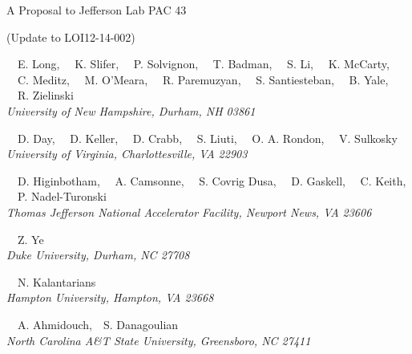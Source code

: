 \begin{center}
A Proposal to Jefferson Lab PAC 43

(Update to LOI12-14-002)

\vspace{15px}

\setcounter{footnote}{\SPOKES}
%
{~~E. Long,\setcounter{footnote}{\SPOKES}
\setcounter{footnote}{\SPOKES}\footnotemark {}
\setcounter{footnote}{\CONTACT}\footnotemark{}
~~K. Slifer,\setcounter{footnote}{\SPOKES}\footnotemark
~~P. Solvignon,\setcounter{footnote}{\SPOKES}\footnotemark
~~T. Badman,
~~S. Li,
~~K. McCarty,
~~C. Meditz,
~~M. O'Meara,
~~R. Paremuzyan,
~~S. Santiesteban,
~~B. Yale,
~~R. Zielinski
}\\
\ls
{\normalsize\it{University of New Hampshire, Durham, NH 03861}}

\vspace{10px}

{~~D. Day,\setcounter{footnote}{\SPOKES}\footnotemark
~~D. Keller,\setcounter{footnote}{\SPOKES}\footnotemark
~~D. Crabb,
~~S. Liuti,
~~O. A. Rondon,
~~V. Sulkosky}\\
\ls
{\normalsize\it{University of Virginia, Charlottesville, VA 22903}}

\vspace{10px}

{~~D. Higinbotham\setcounter{footnote}{\SPOKES}\footnotemark,
~~A. Camsonne,
~~S. Covrig Dusa,
~~D. Gaskell,
~~C. Keith,
~~P. Nadel-Turonski}\\
\ls
{\normalsize\it{Thomas Jefferson National Accelerator Facility, Newport News, VA 23606}}

\vspace{10px}

{~~Z. Ye}\\
\ls
{\normalsize\it{Duke University, Durham, NC 27708}}

\vspace{10px}

{~~N. Kalantarians}\\
\ls
{\normalsize\it{Hampton University, Hampton, VA 23668}}

\vspace{10px}

{~~A. Ahmidouch,~~S. Danagoulian}\\
\ls
{\normalsize\it{North Carolina A\&T State University, Greensboro, NC 27411}}


\end{center}
